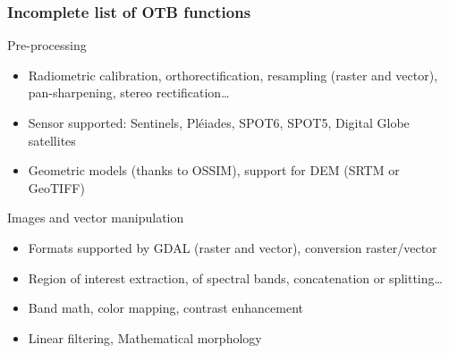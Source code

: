 \documentclass[8pt]{beamer}
\begin{document}
\begin{frame}
\frametitle{Incomplete list of OTB functions}

\begin{block}{Pre-processing}
\begin{itemize}
\item Radiometric calibration, orthorectification, resampling (raster and
  vector), pan-sharpening, stereo rectification\ldots
\item Sensor supported: Sentinels, Pléiades, SPOT6, SPOT5, Digital Globe satellites
\item Geometric models (thanks to OSSIM), support for DEM (SRTM or GeoTIFF)
\end{itemize}
\end{block}

\begin{block}{Images and vector manipulation}
\begin{itemize}
\item Formats supported by GDAL (raster and vector), conversion raster/vector
\item Region of interest extraction, of spectral bands, concatenation or splitting\ldots
\item Band math, color mapping, contrast enhancement
\item Linear filtering, Mathematical morphology
\end{itemize}
\end{block}
\end{frame}
\end{document}
